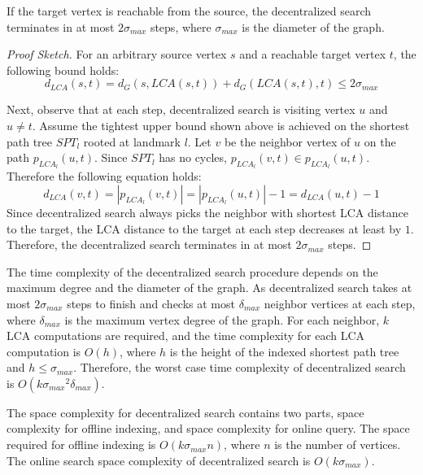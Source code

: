 \begin{theorem}
\label{theorem:max_step}
If the target vertex is reachable from the source, the decentralized search terminates in at most $2{\sigma}_{max}$ steps, where ${\sigma}_{max}$ is the diameter of the graph.
\end{theorem}
\begin{proof}[Proof Sketch]
For an arbitrary source vertex $s$ and a reachable target vertex $t$, the following bound holds:
\[
    d_{LCA}(s,t) = d_G(s,LCA(s,t)) + d_G(LCA(s,t),t) \leq 2{\sigma}_{max}
\]

Next, observe that at each step, decentralized search is visiting vertex $u$ and $u \neq t$. Assume the tightest upper bound shown above is achieved on the shortest path tree $SPT_l$ rooted at landmark $l$. Let $v$ be the neighbor vertex of $u$ on the path $p_{LCA_l}(u,t)$. Since $SPT_l$ has no cycles, $p_{LCA_l}(v,t) \in p_{LCA_l}(u,t)$. Therefore the following equation holds:
\[
		d_{LCA}(v,t) = |p_{LCA_l}(v,t)| = |p_{LCA_l}(u,t)| - 1 = d_{LCA}(u,t) - 1
\]
Since decentralized search always picks the neighbor with shortest LCA distance to the target, the LCA distance to the target at each step decreases at least by $1$. Therefore, the decentralized search terminates in at most $2{\sigma}_{max}$ steps.
\end{proof}

The time complexity of the decentralized search procedure depends on the maximum degree and the diameter of the graph. As decentralized search takes at most $2{\sigma}_{max}$ steps to finish and checks at most ${\delta}_{max}$ neighbor vertices at each step, where ${\delta}_{max}$ is the maximum vertex degree of the graph. For each neighbor, $k$ LCA computations are required, and the time complexity for each LCA computation is $O(h)$,
where $h$ is the height of the indexed shortest path tree and $h \leq {\sigma}_{max}$. Therefore, the worst case time complexity of decentralized search is $O(k{{\sigma}_{max}}^2{\delta}_{max})$. 

The space complexity for decentralized search contains two parts, space complexity for offline indexing, and space complexity for online query. The space required for offline indexing is $O(k{\sigma}_{max}n)$, where $n$ is the number of vertices. 
The online search space complexity of decentralized search is $O(k{\sigma}_{max})$.


